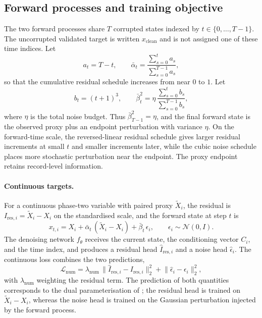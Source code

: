\subsection{Forward processes and training objective}
\label{sec:sird_diffusion}

The two forward processes share $T$ corrupted states indexed by \(t\in\{0,\ldots,T-1\}\). The uncorrupted validated target is written $x_{\mathrm{clean}}$ and is not assigned one of these time indices. Let
\begin{equation}
a_t = T-t,\qquad
\bar{\alpha}_t = \frac{\sum_{s=0}^{t} a_s}{\sum_{s=0}^{T-1} a_s},
\label{eq:sird_alpha_schedule}
\end{equation}
so that the cumulative residual schedule increases from near \(0\) to \(1\). Let
\begin{equation}
b_t = (t+1)^3,\qquad
\bar{\beta}_t^2 = \eta\,\frac{\sum_{s=0}^{t} b_s}{\sum_{s=0}^{T-1} b_s},
\label{eq:sird_beta_schedule}
\end{equation}
where \(\eta\) is the total noise budget. Thus \(\bar{\beta}_{T-1}^2=\eta\), and the final forward state is the observed proxy plus an endpoint perturbation with variance \(\eta\). On the forward-time scale, the reversed-linear residual schedule gives larger residual increments at small \(t\) and smaller increments later, while the cubic noise schedule places more stochastic perturbation near the endpoint. The proxy endpoint retains record-level information.

\paragraph{Continuous targets.} For a continuous phase-two variable with paired proxy $\tilde{X}_i$, the residual is $I_{\text{res},i} = \tilde{X}_i - X_i$ on the standardised scale, and the forward state at step $t$ is
\begin{equation}
x_{t,i} = X_i + \bar{\alpha}_t\, (\tilde{X}_i - X_i) + \bar{\beta}_t\, \epsilon_i, \qquad \epsilon_i \sim \mathcal{N}(0, I).
\label{eq:sird_cont_forward}
\end{equation}
The denoising network $f_\theta$ receives the current state, the conditioning vector $C_i$, and the time index, and produces a residual head $\hat{I}_{\text{res},i}$ and a noise head $\hat{\epsilon}_i$. The continuous loss combines the two predictions,
\begin{equation}
\mathcal{L}_{\text{num}} = \lambda_{\text{num}}\, \bigl\| \hat{I}_{\text{res},i} - I_{\text{res},i} \bigr\|_2^2 + \bigl\| \hat{\epsilon}_i - \epsilon_i \bigr\|_2^2,
\label{eq:sird_cont_loss}
\end{equation}
with $\lambda_{\text{num}}$ weighting the residual term. The prediction of both quantities corresponds to the dual parameterisation of \citet{liu2024residual}; the residual head is trained on \(\tilde X_i-X_i\), whereas the noise head is trained on the Gaussian perturbation injected by the forward process.

